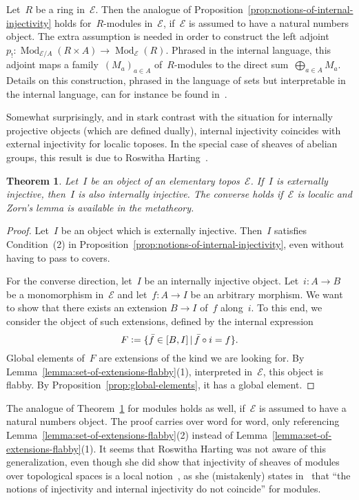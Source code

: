 \documentclass[oneside]{amsart}
\theoremstyle{definition}
\theoremstyle{plain}
\newtheorem{thm}[defn]{Theorem}
\theoremstyle{remark}
\newcommand{\E}{\mathcal{E}}
\newcommand{\defeq}{\vcentcolon=}
\DeclareMathOperator{\Mod}{Mod}
\renewcommand{\_}{\mathpunct{.}\,}
\begin{document}
Let~$R$ be a ring in~$\E$. Then the analogue of
Proposition~\ref{prop:notions-of-internal-injectivity} holds for~$R$-modules
in~$\E$, if~$\E$ is assumed to have a natural numbers object. The extra
assumption is needed in order to construct the left adjoint~$p_! :
\Mod_{\E/A}(R \times A) \to \Mod_\E(R)$. Phrased in the internal language, this
adjoint maps a family~$(M_a)_{a \in A}$ of~$R$-modules to the direct
sum~$\bigoplus_{a \in A} M_a$. Details on this construction, phrased in the
language of sets but interpretable in the internal language, can for instance
be found in~\cite[page~54]{mines-richman-ruitenburg:constructive-algebra}.

Somewhat surprisingly, and in stark contrast with the situation for internally
projective objects (which are defined dually), internal injectivity coincides
with external injectivity for localic toposes. In the special case of sheaves
of abelian groups, this result is due to Roswitha
Harting~\cite[Proposition~2.1]{harting:locally-injective}.

\begin{thm}\label{thm:injectivity-external-internal}
Let~$I$ be an object of an elementary topos~$\E$. If~$I$ is externally
injective, then~$I$ is also internally injective. The converse holds if~$\E$ is
localic and Zorn's lemma is available in the metatheory.
\end{thm}

\begin{proof}Let~$I$ be an object
which is externally injective. Then~$I$ satisfies Condition~(2) in
Proposition~\ref{prop:notions-of-internal-injectivity}, even without having to
pass to covers.

For the converse direction, let~$I$ be an internally
injective object. Let~$i : A \to B$ be a monomorphism in~$\E$ and let~$f :
A \to I$ be an arbitrary morphism. We want to show that there exists an
extension $B \to I$ of~$f$ along~$i$. To this end, we consider the object of
such extensions, defined by the internal expression
\[ F \defeq \{ \bar{f} \in [B,I] \,|\, \bar{f} \circ i = f \}. \]
Global elements of~$F$ are extensions of the kind we are looking for.
By Lemma~\ref{lemma:set-of-extensions-flabby}(1), interpreted in~$\E$, this object is flabby.
By Proposition~\ref{prop:global-elements}, it has a global element.
\end{proof}

The analogue of Theorem~\ref{thm:injectivity-external-internal} for modules
holds as well, if~$\E$ is assumed to have a natural numbers object. The proof
carries over word for word, only referencing
Lemma~\ref{lemma:set-of-extensions-flabby}(2) instead of
Lemma~\ref{lemma:set-of-extensions-flabby}(1).
It seems that Roswitha Harting was not aware of this generalization, even though she did show that
injectivity of sheaves of modules over topological spaces is a local
notion~\cite[Remark~5]{harting:remark}, as she
(mistakenly) states in~\cite[page~233]{harting:remark} that ``the notions of
injectivity and internal injectivity do not coincide'' for modules.
\end{document}
